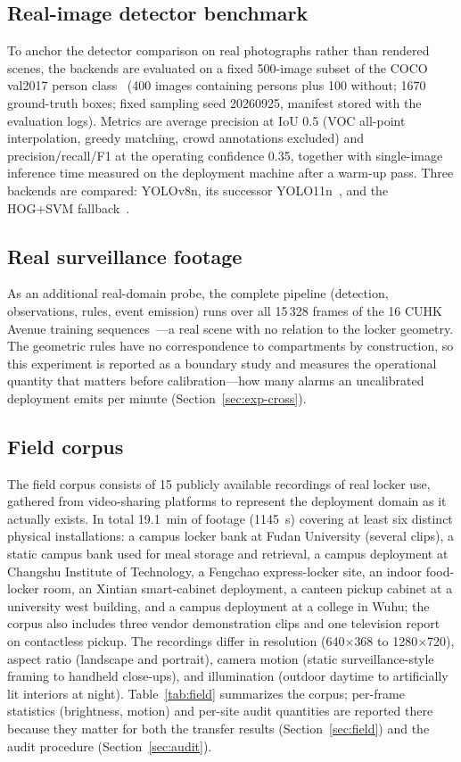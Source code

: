 \documentclass[journal,article,submit,oneauthor]{Definitions/mdpi}
\begin{document}
\subsection{Real-image detector benchmark}
\label{sec:exp-det}
To anchor the detector comparison on real photographs rather than rendered scenes, the
backends are evaluated on a fixed 500-image subset of the COCO val2017 person class~\cite{lin2014coco} (400
images containing persons plus 100 without; 1670 ground-truth boxes; fixed sampling seed
20260925, manifest stored with the evaluation logs). Metrics are average precision at IoU
0.5 (VOC all-point interpolation, greedy matching, crowd annotations excluded) and
precision/recall/F1 at the operating confidence 0.35, together with single-image inference
time measured on the deployment machine after a warm-up pass. Three backends are compared:
YOLOv8n, its successor YOLO11n~\cite{reveles2025yolo11}, and the HOG+SVM
fallback~\cite{dalal2005hog}.

\subsection{Real surveillance footage}
\label{sec:avenue}
As an additional real-domain probe, the complete pipeline (detection, observations, rules,
event emission) runs over all 15\,328 frames of the 16 CUHK Avenue training sequences~\cite{lu2013avenue}---a
real scene with no relation to the locker geometry. The geometric rules have no
correspondence to compartments by construction, so this experiment is reported as a
boundary study and measures the operational quantity that matters before calibration---how
many alarms an uncalibrated deployment emits per minute (Section~\ref{sec:exp-cross}).

\subsection{Field corpus}
\label{sec:field-corpus}
The field corpus consists of 15 publicly available recordings of real locker use, gathered
from video-sharing platforms to represent the deployment domain as it actually exists. In
total 19.1~min of footage (1145~s) covering at least six distinct physical installations:
a campus locker bank at Fudan University (several clips), a static campus bank used for meal
storage and retrieval, a campus deployment at Changshu
Institute of Technology, a Fengchao express-locker site, an indoor food-locker room, an
Xintian smart-cabinet deployment, a canteen pickup cabinet at a university west building,
and a campus deployment at a college in Wuhu; the corpus also includes three vendor
demonstration clips and one television report on contactless pickup. The recordings differ
in resolution (640$\times$368 to 1280$\times$720), aspect ratio (landscape and portrait),
camera motion (static surveillance-style framing to handheld close-ups), and illumination
(outdoor daytime to artificially lit interiors at night). Table~\ref{tab:field} summarizes
the corpus; per-frame statistics (brightness, motion) and per-site audit quantities are
reported there because they matter for both the transfer results
(Section~\ref{sec:field}) and the audit procedure (Section~\ref{sec:audit}).
\end{document}
